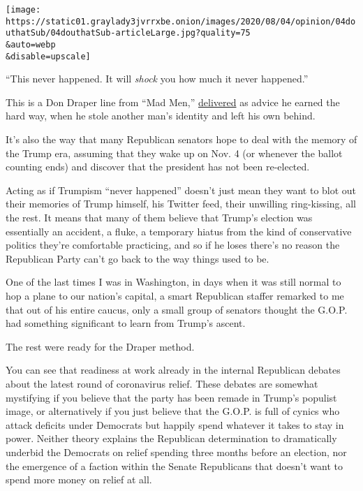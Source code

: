\texttt{[image: https://static01.graylady3jvrrxbe.onion/images/2020/08/04/opinion/04douthatSub/04douthatSub-articleLarge.jpg?quality=75\\\&auto=webp\\\&disable=upscale]}

``This never happened. It will \emph{shock} you how much it never
happened.''

This is a Don Draper line from ``Mad Men,''
\href{https://www.youtube.com/watch?v=kEMe3wj-QuM}{delivered} as advice
he earned the hard way, when he stole another man's identity and left
his own behind.

It's also the way that many Republican senators hope to deal with the
memory of the Trump era, assuming that they wake up on Nov. 4 (or
whenever the ballot counting ends) and discover that the president has
not been re-elected.

Acting as if Trumpism ``never happened'' doesn't just mean they want to
blot out their memories of Trump himself, his Twitter feed, their
unwilling ring-kissing, all the rest. It means that many of them believe
that Trump's election was essentially an accident, a fluke, a temporary
hiatus from the kind of conservative politics they're comfortable
practicing, and so if he loses there's no reason the Republican Party
can't go back to the way things used to be.

One of the last times I was in Washington, in days when it was still
normal to hop a plane to our nation's capital, a smart Republican
staffer remarked to me that out of his entire caucus, only a small group
of senators thought the G.O.P. had something significant to learn from
Trump's ascent.

The rest were ready for the Draper method.

You can see that readiness at work already in the internal Republican
debates about the latest round of coronavirus relief. These debates are
somewhat mystifying if you believe that the party has been remade in
Trump's populist image, or alternatively if you just believe that the
G.O.P. is full of cynics who attack deficits under Democrats but happily
spend whatever it takes to stay in power. Neither theory explains the
Republican determination to dramatically underbid the Democrats on
relief spending three months before an election, nor the emergence of a
faction within the Senate Republicans that doesn't want to spend more
money on relief at all.

